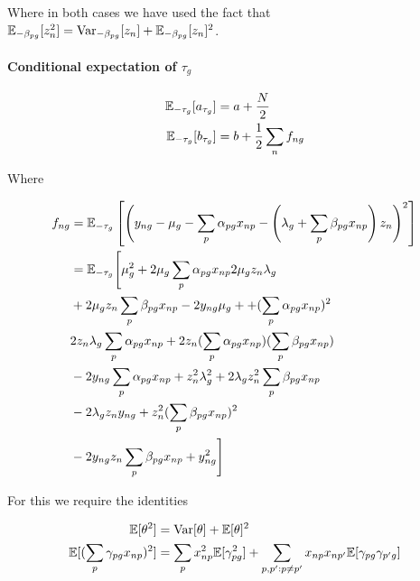 Where in both cases we have used the fact that $\mathbb{E}_{-\beta_{pg}} [z_n^2] = \text{Var}_{-\beta_{pg}}[z_n] + \mathbb{E}_{-\beta_{pg}}[z_n]^2$.

\paragraph{Conditional expectation of $\tau_g$}

\begin{equation}
\begin{aligned}
\mathbb{E}_{-\tau_g}[a_{\tau_g}] & = a + \frac{N}{2} \\
\mathbb{E}_{-\tau_g}[b_{\tau_g}] & = b + \frac{1}{2} \sum_n f_{ng}
\end{aligned}
\end{equation}

Where

\begin{equation}
\begin{aligned}
f_{ng}  & =  \Ex_{-\tau_g} \left[ \left(y_{ng} - \mu_g - \sum_p \alpha_{pg} x_{np} - \left( \lambda_g + \sum_p \beta_{pg} x_{np} \right) z_n
\right)^2 \right] \\
 & =   \Ex_{-\tau_g} \Bigg[ 
\mu_g^2 +  %
2 \mu_g \sum_p \alpha_{pg} x_{np} %
2 \mu_g z_n \lambda_g  \\%
& + 2 \mu_g z_n \sum_p \beta_{pg} x_{np} %
- 2 y_{ng} \mu_g + %
+ (\sum_p \alpha_{pg} x_{np})^2 \\ %
& 2 z_n \lambda_g \sum_p \alpha_{pg} x_{np} %
+ 2 z_n (\sum_p \alpha_{pg} x_{np})(\sum_p\beta_{pg} x_{np}) \\ %
& - 2 y_{ng} \sum_p \alpha_{pg} x_{np}  %
+ z_n^2 \lambda_g^2 %
+ 2 \lambda_g z_n^2 \sum_p \beta_{pg} x_{np} \\ %
& - 2 \lambda_g z_n y_{ng}  %
+ z_n^2 (\sum_p \beta_{pg}x_{np})^2  \\ %
& - 2 y_{ng} z_n \sum_p \beta_{pg}x_{np} %
+ y_{ng}^2 %
\Bigg]
\end{aligned}
\end{equation}

For this we require the identities

\begin{equation}
\begin{aligned}
\mathbb{E}[\theta^2] & = \text{Var}[\theta] + \mathbb{E}[\theta]^2 \\
\mathbb{E}[(\sum_p \gamma_{pg} x_{np})^2] & = \sum_p x_{np}^2 \mathbb{E}[\gamma_{pg}^2] +
\sum_{p,p': p \neq p'} x_{np} x_{np'} \mathbb{E}[\gamma_{pg} \gamma_{p'g}]
\end{aligned}
\end{equation}

